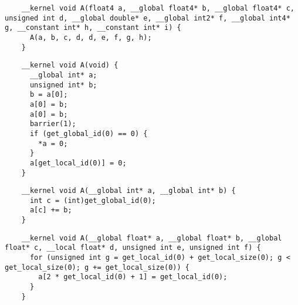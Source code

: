 \newsavebox{\NvidiaRecursionSegfault}
\begin{lrbox}{\NvidiaRecursionSegfault}
  \hspace{1.5em}
  \begin{lstlisting}
    __kernel void A(float4 a, __global float4* b, __global float4* c, unsigned int d, __global double* e, __global int2* f, __global int4* g, __constant int* h, __constant int* i) {
      A(a, b, c, d, d, e, f, g, h);
    }
  \end{lstlisting}
\end{lrbox}

\newsavebox{\XeonPhiSegfault}
\begin{lrbox}{\XeonPhiSegfault}
  \hspace{1.5em}
  \begin{lstlisting}
    __kernel void A(void) {
      __global int* a;
      unsigned int* b;
      b = a[0];
      a[0] = b;
      a[0] = b;
      barrier(1);
      if (get_global_id(0) == 0) {
        *a = 0;
      }
      a[get_local_id(0)] = 0;
    }
  \end{lstlisting}
\end{lrbox}

\newsavebox{\IntelPtrAssertion}
\begin{lrbox}{\IntelPtrAssertion}
  \hspace{1.5em}
  \begin{lstlisting}
    __kernel void A(__global int* a, __global int* b) {
      int c = (int)get_global_id(0);
      a[c] += b;
    }
  \end{lstlisting}
\end{lrbox}

\newsavebox{\IntelScalarAssertion}
\begin{lrbox}{\IntelScalarAssertion}
  \hspace{1.5em}
  \begin{lstlisting}
    __kernel void A(__global float* a, __global float* b, __global float* c, __local float* d, unsigned int e, unsigned int f) {
      for (unsigned int g = get_local_id(0) + get_local_size(0); g < get_local_size(0); g += get_local_size(0)) {
        a[2 * get_local_id(0) + 1] = get_local_id(0);
      }
    }
  \end{lstlisting}
\end{lrbox}

